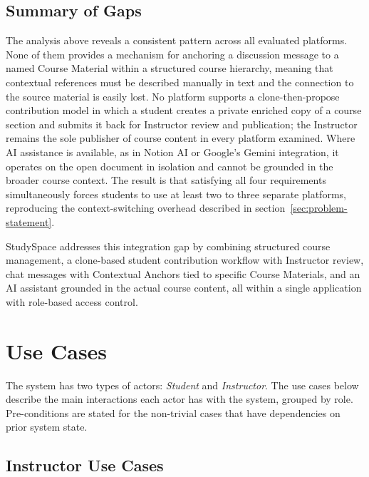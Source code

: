 \subsection{Summary of Gaps}
\label{subsec:gap-summary}

The analysis above reveals a consistent pattern across all evaluated platforms. None of them
provides a mechanism for anchoring a discussion message to a named Course Material within a
structured course hierarchy, meaning that contextual references must be described manually in
text and the connection to the source material is easily lost. No platform supports a
clone-then-propose contribution model in which a student creates a private enriched copy of a
course section and submits it back for Instructor review and publication; the Instructor remains
the sole publisher of course content in every platform examined. Where AI assistance is
available, as in Notion AI or Google's Gemini integration, it operates on the open document in
isolation and cannot be grounded in the broader course context. The result is that satisfying all
four requirements simultaneously forces students to use at least two to three separate platforms,
reproducing the context-switching overhead described in section~\ref{sec:problem-statement}.

StudySpace addresses this integration gap by combining structured course management, a
clone-based student contribution workflow with Instructor review, chat messages with Contextual
Anchors tied to specific Course Materials, and an AI assistant grounded in the actual course
content, all within a single application with role-based access control.

\section{Use Cases}
\label{sec:use-cases}

The system has two types of actors: \emph{Student} and \emph{Instructor}. The use cases below
describe the main interactions each actor has with the system, grouped by role. Pre-conditions
are stated for the non-trivial cases that have dependencies on prior system state.

\subsection*{Instructor Use Cases}

